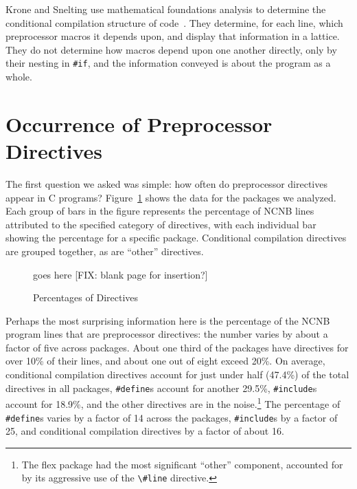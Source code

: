 Krone and Snelting use mathematical foundations analysis to determine the
conditional compilation structure of code~\cite{Krone94}.  They determine,
for each line, which preprocessor macros it depends upon, and display that
information in a lattice.  They do not determine how macros depend upon one
another directly, only by their nesting in \verb|#if|, and the information
conveyed is about the program as a whole.


\section{Occurrence of Preprocessor Directives}\label{sec:directives}

The first question we asked was simple: how often do
preprocessor directives appear in C programs?
Figure~\ref{fig:directives} shows the data for the packages we
analyzed.  Each group of bars in the figure represents the percentage of
NCNB lines attributed to the specified category of directives, with each
individual bar showing the percentage for a specific package.  Conditional
compilation directives are grouped together, as are ``other'' directives.


\begin{figure}
goes here [FIX: blank page for insertion?]
\caption{Percentages of Directives\label{fig:directives}}
\end{figure}

Perhaps the most surprising information here is the percentage of the
NCNB program lines that are preprocessor directives: the number varies
by about a factor of five across packages.  About one third of the
packages have directives for over 10\% of their lines, and about one
out of eight exceed 20\%.  On average, conditional compilation
directives account for just under half (47.4\%) of the total
directives in all packages, \verb+#define+s account for another
29.5\%, \verb+#include+s account for 18.9\%, and the other directives
are in the noise.\footnote{The flex package had the most significant
``other'' component, accounted for by its aggressive use of the
\verb+\#line+ directive.} The percentage of \verb+#define+s varies by a factor of 14
across the packages, \verb+#include+s by a factor of 25, and
conditional compilation directives by a factor of about 16.


